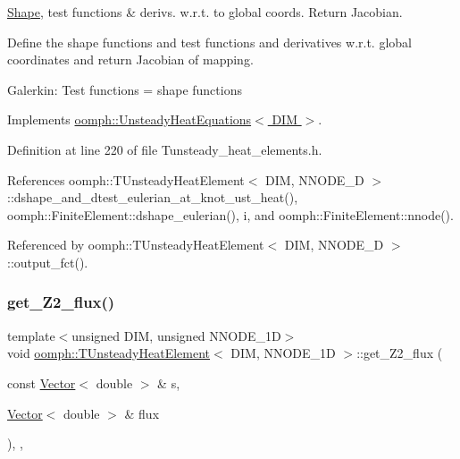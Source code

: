 \hyperlink{classoomph_1_1Shape}{Shape}, test functions \& derivs. w.\+r.\+t. to global coords. Return Jacobian. 

Define the shape functions and test functions and derivatives w.\+r.\+t. global coordinates and return Jacobian of mapping.

Galerkin\+: Test functions = shape functions 

Implements \hyperlink{classoomph_1_1UnsteadyHeatEquations_a70c72c1d6e716657d819264f1131b77c}{oomph\+::\+Unsteady\+Heat\+Equations$<$ D\+I\+M $>$}.



Definition at line 220 of file Tunsteady\+\_\+heat\+\_\+elements.\+h.



References oomph\+::\+T\+Unsteady\+Heat\+Element$<$ D\+I\+M, N\+N\+O\+D\+E\+\_\+D $>$\+::dshape\+\_\+and\+\_\+dtest\+\_\+eulerian\+\_\+at\+\_\+knot\+\_\+ust\+\_\+heat(), oomph\+::\+Finite\+Element\+::dshape\+\_\+eulerian(), i, and oomph\+::\+Finite\+Element\+::nnode().



Referenced by oomph\+::\+T\+Unsteady\+Heat\+Element$<$ D\+I\+M, N\+N\+O\+D\+E\+\_\+D $>$\+::output\+\_\+fct().

\mbox{\label{classoomph_1_1TUnsteadyHeatElement_ac29f36351e80c4af68fe9e728872985d}} 
\subsubsection{\texorpdfstring{get\+\_\+\+Z2\+\_\+flux()}{get\_Z2\_flux()}}
{\footnotesize\ttfamily template$<$unsigned D\+IM, unsigned N\+N\+O\+D\+E\+\_\+1D$>$ \\
void \hyperlink{classoomph_1_1TUnsteadyHeatElement}{oomph\+::\+T\+Unsteady\+Heat\+Element}$<$ D\+IM, N\+N\+O\+D\+E\+\_\+1D $>$\+::get\+\_\+\+Z2\+\_\+flux (\begin{DoxyParamCaption}\item[{const \hyperlink{classoomph_1_1Vector}{Vector}$<$ double $>$ \&}]{s,  }\item[{\hyperlink{classoomph_1_1Vector}{Vector}$<$ double $>$ \&}]{flux }\end{DoxyParamCaption})\hspace{0.3cm}{\ttfamily [inline]}, {\ttfamily [protected]}, {\ttfamily [virtual]}}




